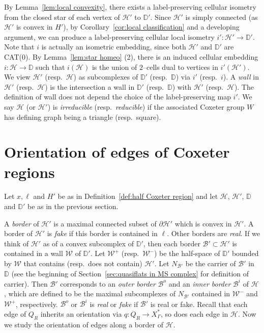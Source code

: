 \documentclass[11pt]{amsart}
\newcommand {\B}{\mathcal B}
\newcommand {\D}{\mathbb D}
\newcommand {\h}{\mathcal H}
\newcommand {\W}{\mathcal W}
\theoremstyle{definition}
\newcommand{\Xa}{X^{\ast}}
\begin{document}
By Lemma~\ref{lem:local convexity}, there exists a label-preserving cellular isometry from the closed star of each vertex of $\h'$ to $\D'$. Since $\h'$ is simply connected (as $\h'$ is convex in $H'$), by Corollary~\ref{cor:local classification} and a developing argument, we can produce a label-preserving cellular local isometry $i'\colon \h'\to \D'$. Note that $i$ is actually an isometric embedding, since both $\h'$ and $\D'$ are CAT(0). By Lemma~\ref{lem:star homeo} (2), there is an induced cellular embedding $i\colon \h\to\D$ such that $i(\h)$ is the union of $2$--cells dual to vertices in $i'(\h')$. We view $\h'$ (resp.\ $\h$) as subcomplexes of $\D'$ (resp.\ $\D$) via $i'$ (resp.\ $i$). A \emph{wall} in $\h'$ (resp.\ $\h$) is the intersection a wall in $\D'$ (resp.\ $\D$) with $\h'$ (resp.\ $\h$). The definition of wall does not depend the choice of the label-preserving map $i'$. We say $\h$ (or $\h'$) is \emph{irreducible} (resp.\ \emph{reducible}) if the associated Coxeter group $W$ has defining graph being a triangle (resp.\ square). 

\section{Orientation of edges of Coxeter regions} 
\label{sec:orientation of edges of Coxeter regions}
Let $x,\ell$ and $H'$ be as in Definition~\ref{def:half Coxeter region} and let $\h$, $\h'$, $\D$ and $\D'$ be as in the previous section.
 
A \emph{border} of $\h'$ is a maximal connected subset of $\partial\h'$ which is convex in $\h'$. A border of $\h'$ is \emph{fake} if this border is contained in $\ell$. Other borders are \emph{real}. If we think of $\h'$ as of a convex subcomplex of $\D'$, then each border $\B'\subset\h'$ is contained in a wall $\W$ of $\D'$. Let $\W^+$ (resp.\ $\W^-$) be the half-space of $\D'$ bounded by $\W$ that contains (resp.\ does not contain) $\h'$. Let $N_{\B'}$ be the carrier of $\B'$ in $\D$ (see the beginning of Section~\ref{sec:quasiflats in MS complex} for definition of carrier). Then $\B'$ corresponds to an \emph{outer border} $\B^o$ and an \emph{inner border} $\B^i$ of $\h$, which are defined to be the maximal subcomplexes of $N_{\B'}$ contained in $\W^-$ and $\W^+$, respectively. $\B^o$ or $\B^i$ is \emph{real} or \emph{fake} if $\B'$ is real or fake. Recall that each edge of $Q_R$ inherits an orientation via $q\colon Q_R\to\Xa_\Gamma$, so does each edge in $\h$. Now we study the orientation of edges along a border of $\h$.
\end{document}
